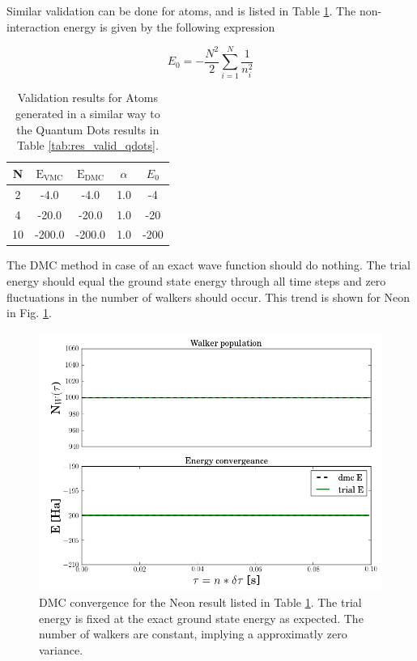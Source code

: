 Similar validation can be done for atoms, and is listed in Table \ref{tab:res_valid_atoms}. The non-interaction energy is given by the following expression

\begin{equation}
 E_0 = -\frac{N^2}{2}\sum_{i=1}^N \frac{1}{n_i^2}
\end{equation}


\begin{table}
\begin{center}
\begin{tabular}{c|cccc}
    N     & $\mathrm{E_{VMC}}$ & $\mathrm{E_{DMC}}$ & $\alpha$ & $E_0$\\
\hline
    2     &   -4.0   &   -4.0   &   1.0  & -4  \\
    4     &  -20.0   &  -20.0   &   1.0  & -20 \\
    10    &  -200.0  &  -200.0  &   1.0  & -200\\
\end{tabular}
\caption{Validation results for Atoms generated in a similar way to the Quantum Dots results in Table \ref{tab:res_valid_qdots}.}
\label{tab:res_valid_atoms}
\end{center}
\end{table}

The DMC method in case of an exact wave function should do nothing. The trial energy should equal the ground state energy through all time steps and zero fluctuations in the number of walkers should occur. This trend is shown for Neon in Fig. \ref{fig:DMC_neon_nonint}.

\begin{figure}
 \begin{center}
  \includegraphics[scale=0.5]{../Graphics/DMC_neon_valid.png}
  \caption{DMC convergence for the Neon result listed in Table \ref{tab:res_valid_atoms}. The trial energy is fixed at the exact ground state energy as expected. The number of walkers are constant, implying a approximatly zero variance.}
  \label{fig:DMC_neon_nonint}
 \end{center}
\end{figure}

